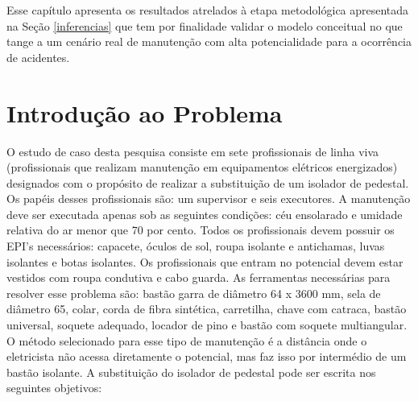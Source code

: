 Esse capítulo apresenta os resultados atrelados à etapa metodológica apresentada na Seção \ref{inferencias} que tem por finalidade validar o modelo conceitual no que tange a um cenário real de manutenção com alta potencialidade para a ocorrência de acidentes. 

\section{Introdução ao Problema}

O estudo de caso desta pesquisa consiste em sete profissionais de linha viva (profissionais que realizam manutenção em equipamentos elétricos energizados) designados com o propósito de realizar a substituição de um isolador de pedestal. Os papéis desses profissionais são: um supervisor e seis executores. A manutenção deve ser executada apenas sob as seguintes condições: céu ensolarado e umidade relativa do ar menor que 70 por cento. Todos os profissionais devem possuir os EPI's necessários: capacete, óculos de sol, roupa isolante e antichamas, luvas isolantes e botas isolantes. Os profissionais que entram no potencial devem estar vestidos com roupa condutiva e cabo guarda. As ferramentas necessárias para resolver esse problema são: bastão garra de diâmetro 64 x 3600 mm, sela de diâmetro 65, colar, corda de fibra sintética, carretilha, chave com catraca, bastão universal, soquete adequado, locador de pino e bastão com soquete multiangular. O método selecionado para esse tipo de manutenção é a distância onde o eletricista não acessa diretamente o potencial, mas faz isso por intermédio de um bastão isolante. A substituição do isolador 
de pedestal pode ser escrita nos seguintes objetivos: 

